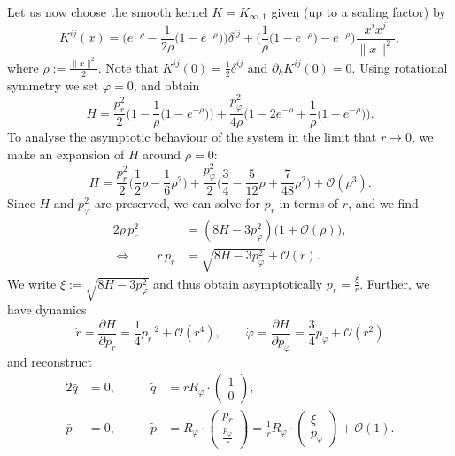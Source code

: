 \documentclass[a4paper,11pt]{article}
\begin{document}
Let us now choose the smooth kernel $K = K_{\infty,1}$ given
(up to a scaling factor) by
%
{\newcommand{\e}{e^{-\rho}}
\begin{equation}\label{eq:smooth-kernel}
  K^{ij}(x) = \Big(\e - \frac{1}{2\rho}\big(1 - \e\big)\Big)\delta^{ij}
    + \Big(\frac{1}{\rho}\big(1 - \e\big) - \e\Big)\frac{x^i x^j}{\|x\|^2},
\end{equation}%
}%
where $\rho := \frac{\|x\|^2}{2}$. Note that
$K^{ij}(0) = \frac{1}{2} \delta^{ij}$ and $\partial_k K^{ij}(0) = 0$.
Using rotational symmetry we set $\varphi = 0$, and obtain
\begin{equation}\label{eq:H-rot-reduced}
  H = \frac{p_r^2      }{2}    \Big(1 - \frac{1}{\rho}\big(1-e^{-\rho}\big)\Big)
     +\frac{p_\varphi^2}{4\rho}\Big(1 - 2e^{-\rho} + \frac{1}{\rho}\big(1-e^{-\rho}\big)\Big).
\end{equation}
To analyse the asymptotic behaviour of the system in the limit that
$r \to 0$, we make an expansion of $H$ around $\rho = 0$:
\begin{equation}
  H = \frac{p_r^2      }{2}\big(\frac{1}{2}\rho - \frac{1}{6}\rho^2\big)
     +\frac{p_\varphi^2}{2}\big(\frac{3}{4} - \frac{5}{12}\rho + \frac{7}{48}\rho^2\big)
     +\mathcal{O}(\rho^3).
\end{equation}
Since $H$ and $p_\varphi^2$ are preserved, we can solve for $p_r$ in
terms of $r$, and we find
\begin{align*}
  2\rho\,p_r^2 &= (8H - 3 p_\varphi^2) \big(1 + \mathcal{O}(\rho)\big), \\
\Longleftrightarrow \qquad
      r\,p_r   &= \sqrt{8H - 3 p_\varphi^2} + \mathcal{O}(r).
\end{align*}
We write $\xi := \sqrt{8H - 3 p_\varphi^2}$ and thus obtain
asymptotically $p_r = \frac{\xi}{r}$. Further, we have dynamics
\begin{equation}
  \dot{r} = \frac{\partial H}{\partial p_r} = \frac{1}{4}p_r\,^2 + \mathcal{O}(r^4), \qquad
  \dot{\varphi} = \frac{\partial H}{\partial p_\varphi}
                 = \frac{3}{4}p_\varphi + \mathcal{O}(r^2)
\end{equation}
and reconstruct
\begin{alignat*}{2}
  \bar{q}   &= 0,& \qquad
  \tilde{q} &= r R_\varphi \cdot\begin{pmatrix} 1 \\ 0 \end{pmatrix},\\
  \bar{p}   &= 0,& \qquad
  \tilde{p} &= R_\varphi \cdot
               \begin{pmatrix} p_r \\ \frac{p_\varphi}{r} \end{pmatrix}
             = \frac{1}{r} R_\varphi \cdot
               \begin{pmatrix} \xi \\ p_\varphi \end{pmatrix} + \mathcal{O}(1).
\end{alignat*}
\end{document}
